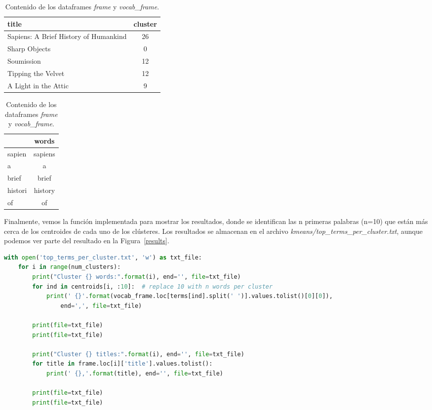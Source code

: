 \documentclass{uimppracticas}
\begin{document}
\begin{table}[H]
	\centering
	\caption{Contenido de los dataframes \textit{frame} y \textit{vocab\_frame}.}
	\begin{minipage}{.6\linewidth}
		\centering
		\begin{tabular}{lc}
			\toprule
			title &  cluster \\
			\midrule
			Sapiens: A Brief History of Humankind & 26 \\
			Sharp Objects & 0 \\
			Soumission & 12 \\
			Tipping the Velvet & 12 \\
			A Light in the Attic & 9 \\
			\bottomrule
		\end{tabular}
	\end{minipage}%
	\begin{minipage}{.4\linewidth}
		\centering
		\begin{tabular}{lc}
			\toprule
			& words \\
			\midrule
			sapien & sapiens \\
			a & a \\
			brief & brief \\
			histori & history \\
			of & of \\
			\bottomrule
		\end{tabular}
	\end{minipage} 
\end{table}

Finalmente, vemos la función implementada para mostrar los resultados, donde se identifican las n primeras palabras (n=10) que están más cerca de los centroides de cada uno de los clústeres. Los resultados se almacenan en el archivo \textit{kmeans/top\_terms\_per\_cluster.txt}, aunque podemos ver parte del resultado en la Figura~\ref{results}. 

\begin{lstlisting}[language=python, basicstyle=\small]
with open('top_terms_per_cluster.txt', 'w') as txt_file:
	for i in range(num_clusters):
		print("Cluster {} words:".format(i), end='', file=txt_file)
		for ind in centroids[i, :10]:  # replace 10 with n words per cluster
			print(' {}'.format(vocab_frame.loc[terms[ind].split(' ')].values.tolist()[0][0]), 
				end=',', file=txt_file)
	
		print(file=txt_file)
		print(file=txt_file)
	
		print("Cluster {} titles:".format(i), end='', file=txt_file)
		for title in frame.loc[i]['title'].values.tolist():
			print(' {},'.format(title), end='', file=txt_file)
	
		print(file=txt_file)
		print(file=txt_file)
\end{lstlisting}
\end{document}
